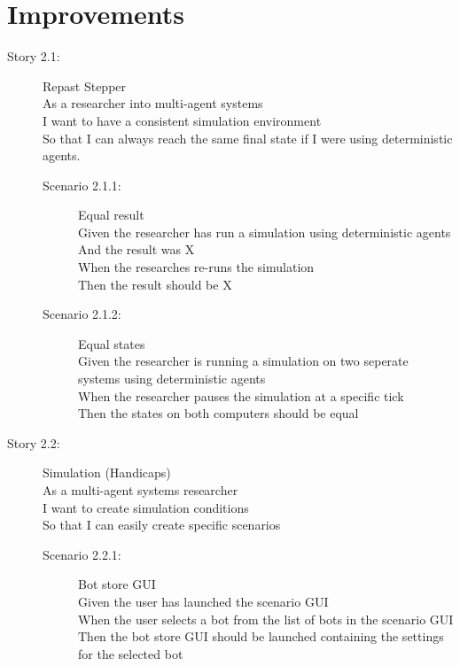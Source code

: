 \documentclass{article}
\begin{document}
\section{Improvements}
    \begin{description}
    \item[Story 2.1:] Repast Stepper\\
    As a researcher into multi-agent systems\\
    I want to have a consistent simulation environment\\
    So that I can always reach the same final state if I were using deterministic agents.
    
        \begin{description}
        \item[Scenario 2.1.1:] Equal result\\
        Given the researcher has run a simulation using deterministic agents\\
        And the result was X\\
        When the researches re-runs the simulation\\
        Then the result should be X
        
        \item[Scenario 2.1.2:] Equal states\\
        Given the researcher is running a simulation on two seperate systems using deterministic agents\\
        When the researcher pauses the simulation at a specific tick\\
        Then the states on both computers should be equal
    \end{description}
  \item[Story 2.2:] Simulation (Handicaps)\\
  As a multi-agent systems researcher\\
  I want to create simulation conditions\\
  So that I can easily create specific scenarios
  
  \begin{description}
    \item[Scenario 2.2.1:] Bot store GUI\\
    Given the user has launched the scenario GUI\\
    When the user selects a bot from the list of bots in the scenario GUI\\
    Then the bot store GUI should be launched containing the settings for the selected bot
    

\end{description}
\end{description}
\end{document}
